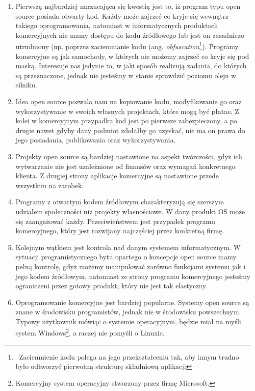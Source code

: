 \documentclass{article}
\begin{document}
\begin{enumerate}
    \item Pierwszą najbardziej narzucającą się kwestią jest to, iż program typu open source posiada otwarty kod. Każdy może zajrzeć co kryje się wewnątrz takiego oprogramowania, natomiast w informatycznych produktach komercyjnych nie mamy dostępu do kodu źródłowego lub jest on zasadniczo utrudniony (np. poprzez zaciemnianie kodu (ang. \emph{obfuscation}\footnote{\, Zaciemnienie kodu polega na jego przekształceniu tak, aby innym trudno było odtworzyć pierwotną strukturę składniową aplikacji\cite{Kotula}}). Programy komercyjne są jak samochody, w których nie możemy zajrzeć co kryje się pod maską. Interesuje nas jedynie to, w jaki sposób realizują zadania, do których są przeznaczone, jednak nie jesteśmy w stanie sprawdzić poziomu oleju w silniku.
    
    \item Idea open source pozwala nam na kopiowanie kodu, modyfikowanie go oraz wykorzystywanie w swoich własnych projektach, które mogą być płatne. Z kolei w komercyjnym przypadku kod jest po pierwsze zabezpieczony, a po drugie nawet gdyby dany podmiot zdołałby go uzyskać, nie ma on prawa do jego posiadania, publikowania oraz wykorzystywania.
    
    \item Projekty open source są bardziej nastawione na aspekt twórczości, gdyż ich wytwarzanie nie jest uzależnione od finansów oraz wymagań konkretnego klienta. Z drugiej strony aplikacje komercyjne są nastawione przede wszystkim na zarobek.
    
    \item Programy z otwartym kodem źródłowym charakteryzują się szerszym udziałem społeczności niż projekty własnościowe. W dany produkt OS może się zaangażować każdy. Przeciwieństwem jest przypadek programu komercyjnego, który jest rozwijany najczęściej przez konkretną firmę. 
    
    \item Kolejnym wątkiem jest kontrola nad danym systemem informatycznym. W sytuacji programistycznego bytu opartego o koncepcje open source mamy pełną kontrolę, gdyż możemy manipulować zarówno funkcjami systemu jak i jego kodem źródłowym, natomiast ze strony programu komercyjnego jesteśmy ograniczeni przez gotowy produkt, który nie jest tak elastyczny.
    
    \item Oprogramowanie komercyjne jest bardziej popularne. Systemy open source są znane w środowisku programistów, jednak nie w środowisku powszechnym. Typowy użytkownik mówiąc o systemie operacyjnym, będzie miał na myśli system Windows\footnote{Komercyjny system operacyjny stworzony przez firmę Microsoft.}, a raczej nie pomyśli o Linuxie.
    

\end{enumerate}
\end{document}
